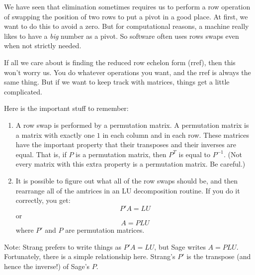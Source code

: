 \documentclass[10pt,]{book}
\theoremstyle{plain}
\theoremstyle{definition}
\numberwithin{equation}{section}
\begin{document}
        We have seen that elimination sometimes requires us to perform a row
        operation of swapping the position of two rows to put a pivot in a good
        place. At first, we want to do this to avoid a zero. But for computational
        reasons, a machine really likes to have a \emph{big} number as a pivot.
        So software often uses rows swaps even when not strictly needed.
\par

        If all we care about is finding the reduced row echelon form (rref),
        then this won't worry us. You do whatever operations you want, and the
        rref is always the same thing. But if we want to keep track with matrices,
        things get a little complicated.
\par

        Here is the important stuff to remember:
        \begin{enumerate}
\item{}A row swap is performed by a permutation matrix. A permutation matrix
            is a matrix with exactly one \(1\) in each column and in each row.
            These matrices have the important property that their transposes and
            their inverses are equal. That is, if \(P\) is a permutation matrix,
            then \(P^T\) is equal to \(P^{-1}\). (Not every matrix with
            this extra property is a permutation matrix. Be careful.)
          \item{}
            It is possible to figure out what all of the row swaps should be, and
            then rearrange all of the amtrices in an LU decomposition routine.
            If you do it correctly, you get:
            \[
              P'A = LU
            \]
            or
            \[
              A = PLU
            \]
            where \(P'\) and \(P\) are permutation matrices.
          \end{enumerate}

\par

        Note: Strang prefers to write things as \(P'A = LU\), but Sage writes
        \(A = PLU\). Fortunately, there is a simple relationship here. Strang's
        \(P'\) is the transpose (and hence the inverse!) of Sage's \(P\).
\par
\end{document}

